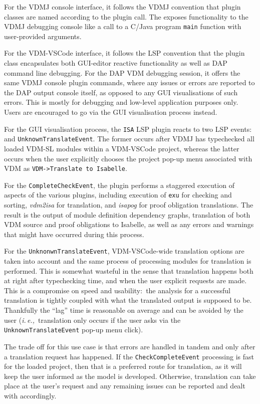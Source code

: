 \documentclass[runningheads,a4paper]{llncs}
\newcommand{\ie}{{\em i.\,e.,\/}}
\begin{document}
For the VDMJ console interface, it follows the VDMJ convention that plugin classes are named according to the plugin call. The exposes functionality to the VDMJ debugging console like a call to a C/Java program \texttt{main} function with user-provided arguments.   

For the VDM-VSCode interface, it follows the LSP convention that the plugin class encapsulates both GUI-editor reactive functionality as well as DAP command line debugging. For the DAP VDM debugging session, it offers the same VDMJ console plugin commands, where any issues or errors are reported to the DAP output console itself, as opposed to any GUI visualisations of such errors. This is mostly for debugging and low-level application purposes only. Users are encouraged to go via the GUI visualisation process instead. 

For the GUI visualisation process, the \texttt{ISA} LSP plugin reacts to two LSP events:~ and \texttt{UnknownTranslateEvent}. The former occurs after VDMJ has typechecked all loaded VDM-SL modules within a VDM-VSCode project, whereas the latter occurs when the user explicitly chooses the project pop-up menu associated with VDM as {\verb'VDM->Translate to Isabelle'}. 

For the \texttt{CompleteCheckEvent}, the plugin performs a staggered execution of aspects of the various plugins, including execution of \texttt{exu} for checking and sorting, \textit{vdm2isa} for translation, and \textit{isapog} for proof obligation translations. The result is the output of module definition dependency graphs, translation of both VDM source and proof obligations to Isabelle, as well as any errors and warnings that might have occurred during this process. 

For the \texttt{UnknonwnTranslateEvent}, VDM-VSCode-wide translation options are taken into account and the same process of processing modules for translation is performed. This is somewhat wasteful in the sense that translation happens both at right after typechecking time, and when the user explicit requests are made. This is a compromise on speed and usability:~the analysis for a successful translation is tightly coupled with what the translated output is supposed to be. Thankfully the ``lag'' time is reasonable on average and can be avoided by the user (\ie~translation only occurs if the user asks via the \texttt{UnknownTranslateEvent} pop-up menu click). 

The trade off for this use case is that errors are handled in tandem and only after a translation request has happened. If the \texttt{CheckCompleteEvent} processing is fast for the loaded project, then that is a preferred route for translation, as it will keep the user informed as the model is developed. Otherwise, translation can take place at the user's request and any remaining issues can be reported and dealt with accordingly.  
\end{document}
